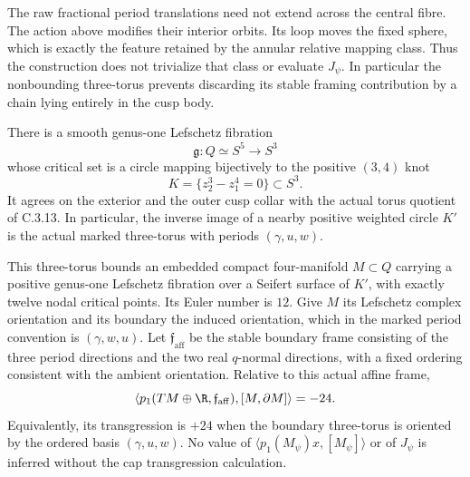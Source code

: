 \begin{remark}[Scope]
The raw fractional period translations need not extend across
the central fibre. The action above modifies their interior
orbits. Its loop moves the fixed sphere, which is exactly the
feature retained by the annular relative mapping class. Thus
the construction does not trivialize that class or evaluate
$J_\psi$. In particular the nonbounding three-torus prevents
discarding its stable framing contribution by a chain lying
entirely in the cusp body.
\end{remark}
\begin{proposition}
There is a smooth genus-one Lefschetz fibration
\[
 \mathfrak g:Q\simeq S^5\longrightarrow S^3
\]
whose critical set is a circle mapping bijectively to the positive
$(3,4)$ knot
\[
 K=\{z_2^3-z_1^4=0\}\subset S^3.
\]
It agrees on the exterior and the outer cusp collar with the
actual torus quotient of C.3.13. In particular, the inverse image
of a nearby positive weighted circle $K'$ is the actual marked
three-torus with periods $(\gamma,u,w)$.

This three-torus bounds an embedded compact four-manifold
$M\subset Q$ carrying a positive genus-one Lefschetz fibration
over a Seifert surface of $K'$, with exactly twelve nodal critical
points. Its Euler number is $12$. Give $M$ its Lefschetz complex
orientation and its boundary the induced orientation, which in
the marked period convention is $(\gamma,w,u)$. Let
$\mathfrak f_{\mathrm{aff}}$ be the stable boundary frame consisting
of the three period directions and the two real $q$-normal
directions, with a fixed ordering consistent with the ambient
orientation. Relative to this actual affine frame,
\[
 \left\langle p_1(TM\oplus\R,\mathfrak f_{\mathrm{aff}}),
                   [M,\partial M]\right\rangle=-24.
\]
Equivalently, its transgression is $+24$ when the boundary
three-torus is oriented by the ordered basis $(\gamma,u,w)$.
No value of $\langle p_1(M_\psi)x,[M_\psi]\rangle$ or of
$J_\psi$ is inferred without the cap transgression calculation.
\end{proposition}

